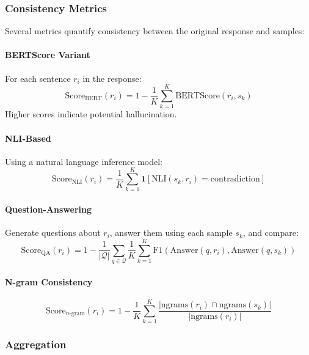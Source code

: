 \documentclass[11pt]{article}
\begin{document}
\subsubsection{Consistency Metrics}

Several metrics quantify consistency between the original response and samples:

\paragraph{BERTScore Variant}
For each sentence $r_i$ in the response:
\begin{equation}
\text{Score}_{\text{BERT}}(r_i) = 1 - \frac{1}{K}\sum_{k=1}^K \text{BERTScore}(r_i, s_k)
\end{equation}
Higher scores indicate potential hallucination.

\paragraph{NLI-Based}
Using a natural language inference model:
\begin{equation}
\text{Score}_{\text{NLI}}(r_i) = \frac{1}{K}\sum_{k=1}^K \mathbf{1}[\text{NLI}(s_k, r_i) = \text{contradiction}]
\end{equation}

\paragraph{Question-Answering}
Generate questions about $r_i$, answer them using each sample $s_k$, and compare:
\begin{equation}
\text{Score}_{\text{QA}}(r_i) = 1 - \frac{1}{|\mathcal{Q}|}\sum_{q \in \mathcal{Q}} \frac{1}{K}\sum_{k=1}^K \text{F1}(\text{Answer}(q, r_i), \text{Answer}(q, s_k))
\end{equation}

\paragraph{N-gram Consistency}
\begin{equation}
\text{Score}_{n\text{-gram}}(r_i) = 1 - \frac{1}{K}\sum_{k=1}^K \frac{|\text{ngrams}(r_i) \cap \text{ngrams}(s_k)|}{|\text{ngrams}(r_i)|}
\end{equation}

\subsubsection{Aggregation}
\end{document}
